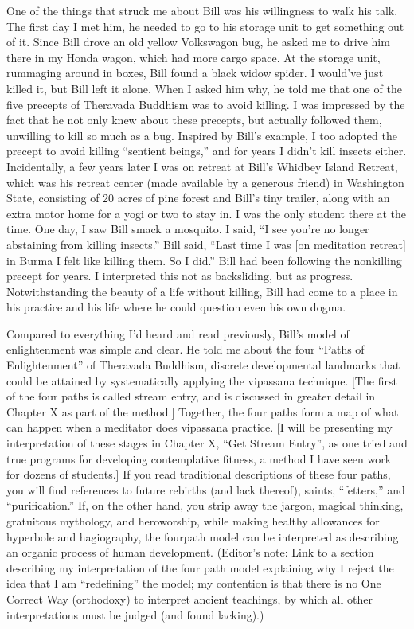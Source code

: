 \documentclass[a5paper,10pt,english]{book}
\begin{document}
\sphinxAtStartPar
One of the things that struck me about Bill was his willingness to walk
his talk. The first day I met him, he needed to go to his storage unit
to get something out of it. Since Bill drove an old yellow Volkswagon
bug, he asked me to drive him there in my Honda wagon, which had more
cargo space. At the storage unit, rummaging around in boxes, Bill found
a black widow spider. I would’ve just killed it, but Bill left it alone.
When I asked him why, he told me that one of the five precepts of
Theravada Buddhism was to avoid killing. I was impressed by the fact
that he not only knew about these precepts, but actually followed them,
unwilling to kill so much as a bug. Inspired by Bill’s example, I too
adopted the precept to avoid killing “sentient beings,” and for years I
didn’t kill insects either. Incidentally, a few years later I was on
retreat at Bill’s Whidbey Island Retreat, which was his retreat center
(made available by a generous friend) in Washington State, consisting of
20 acres of pine forest and Bill’s tiny trailer, along with an extra
motor home for a yogi or two to stay in. I was the only student there at
the time. One day, I saw Bill smack a mosquito. I said, “I see you’re no
longer abstaining from killing insects.” Bill said, “Last time I was {[}on
meditation retreat{]} in Burma I felt like killing them. So I did.” Bill
had been following the non\sphinxhyphen{}killing precept for years. I interpreted this
not as backsliding, but as progress. Notwithstanding the beauty of a
life without killing, Bill had come to a place in his practice and his
life where he could question even his own dogma.

\sphinxAtStartPar
Compared to everything I’d heard and read previously, Bill’s model of
enlightenment was simple and clear. He told me about the four “Paths of
Enlightenment” of Theravada Buddhism, discrete developmental landmarks
that could be attained by systematically applying the vipassana
technique. {[}The first of the four paths is called stream entry, and is
discussed in greater detail in Chapter X as part of the method.{]}
Together, the four paths form a map of what can happen when a meditator
does vipassana practice. {[}I will be presenting my interpretation of
these stages in Chapter X, “Get Stream Entry”, as one tried and true
programs for developing contemplative fitness, a method I have seen work
for dozens of students.{]} If you read traditional descriptions of these
four paths, you will find references to future rebirths (and lack
thereof), saints, “fetters,” and “purification.” If, on the other hand,
you strip away the jargon, magical thinking, gratuitous mythology, and
hero\sphinxhyphen{}worship, while making healthy allowances for hyperbole and
hagiography, the four\sphinxhyphen{}path model can be interpreted as describing an
organic process of human development. (Editor’s note: Link to a section
describing my interpretation of the four path model explaining why I
reject the idea that I am “redefining” the model; my contention is that
there is no One Correct Way (orthodoxy) to interpret ancient teachings,
by which all other interpretations must be judged (and found lacking).)
\end{document}
